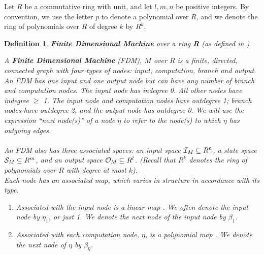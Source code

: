 \documentclass[twoside]{article}
\newtheorem{definition}{Definition}[section]
\begin{document}
Let $R$ be a commutative ring with unit, and let $l, m, n$ be positive
integers.  By convention, we use the letter $p$ to denote a polynomial
over $R$, and we denote the ring of polynomials over $R$ of degree $k$
by $R^k$. 

\begin{definition}{\textbf{Finite Dimensional Machine} over a ring
    \textbf{R} (as defined in \cite{B98})}
  
  A \textbf{Finite Dimensional Machine} (FDM), $M$ over $R$ is a
  finite, directed, connected graph with four types of nodes:
  \emph{input, computation, branch} and \emph{output}.  An FDM has one
  input and one output node but can have any number of branch and
  computation nodes. The input node has indegree 0.  All other nodes
  have indegree $\geq$ 1. The input node and computation nodes have
  outdegree 1; branch nodes have outdegree 2, and the output node has
  outdegree 0.  We will use the expression ``next node(s)'' of a node
  $\eta$ to refer to the node(s) to which $\eta$ has outgoing edges.\\
  
  \emph{}\\
  
  An FDM also has three associated spaces: an input space $\mathcal{I}_M
  \subseteq R^n$, a state space $\mathcal{S}_M \subseteq R^m$, and an
  output space $\mathcal{O}_M \subseteq R^l$.  (Recall that $R^k$
  denotes the ring of polynomials over $R$ with degree at most $k$).\\

  Each node has an associated map, which varies in structure in
  accordance with its type.
  \begin{enumerate}
  \item Associated with the input node is a linear map
    . We often denote the input
    node by $\eta_1$, or just 1. We denote the next node of the input
    node by $\beta_1$.
    
  \item Associated with each computation node, $\eta$, is a polynomial
    map . We denote the
    next node of $\eta$ by $\beta_\eta$.
    

\end{enumerate}
\end{definition}
\end{document}
